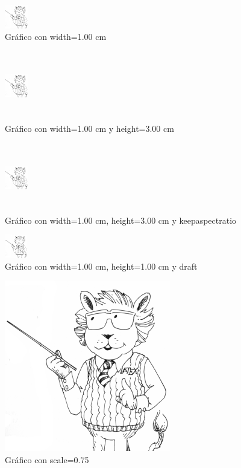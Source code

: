 \documentclass[12pt]{article}
\begin{document}
\begin{figure}
\centering
\includegraphics[width=1.0cm]{LaTeXlion2.png}
\caption{Gráfico con width=1.00 cm}
\label{fig:2}
\end{figure}

\begin{figure}
\centering
\includegraphics[width=1.0cm, height=3.0cm]{LaTeXlion2.png}
\caption{Gráfico con width=1.00 cm y height=3.00 cm}
\label{fig:3}
\end{figure}

\begin{figure}
\centering
\includegraphics[width=1.0cm, height=3.0cm, keepaspectratio]{LaTeXlion2.png}
\caption{Gráfico con width=1.00 cm, height=3.00 cm y keepaspectratio}
\label{fig:4}
\end{figure}

\begin{figure}
\centering
\includegraphics[width=1.0cm, height=1.0cm, draft]{LaTeXlion2.png}
\caption{Gráfico con width=1.00 cm, height=1.00 cm y draft}
\label{fig:5}
\end{figure}

\begin{figure}
\centering
\includegraphics[scale=0.75]{LaTeXlion2.png}
\caption{Gráfico con scale=0.75}
\label{fig:6}
\end{figure}
\end{document}
